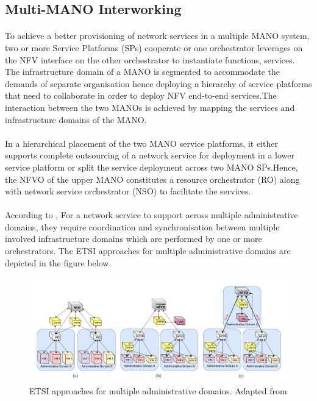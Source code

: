 \subsection{Multi-MANO Interworking}
\paragraph{}To achieve a better provisioning of network services in a multiple MANO system, two or more Service Platforms (SPs) cooperate or one orchestrator leverages on the NFV interface on the other orchestrator to instantiate functions, services. The infrastructure domain of a MANO is segmented to accommodate the demands of separate organisation hence deploying a hierarchy of service platforms that need to collaborate in order to deploy NFV end-to-end services.The interaction between the two MANOs is achieved by mapping the services and infrastructure domains of the MANO. 

\paragraph{}In a hierarchical placement of the two MANO service platforms, it either supports complete outsourcing of a network service for deployment in a lower service platform or split the service deployment across two MANO SPs.Hence, the NFVO of the upper MANO constitutes a resource orchestrator (RO) along with network service orchestrator (NSO) to facilitate the services.



\paragraph{}According to \cite{de2018network} , For a network service to support across multiple administrative domains, they require coordination and synchronisation between multiple involved infrastructure domains which are performed by one or more orchestrators. The ETSI approaches for multiple administrative domains are depicted in the figure below.

\begin{figure} [H]
	\centering
	\includegraphics[width=0.8\linewidth]{"figures/ETSI approaches"}
	\caption{ETSI approaches for multiple administrative domains. Adapted from \cite{de2018network}}
	\label{fig:etsi-approaches}
\end{figure}


